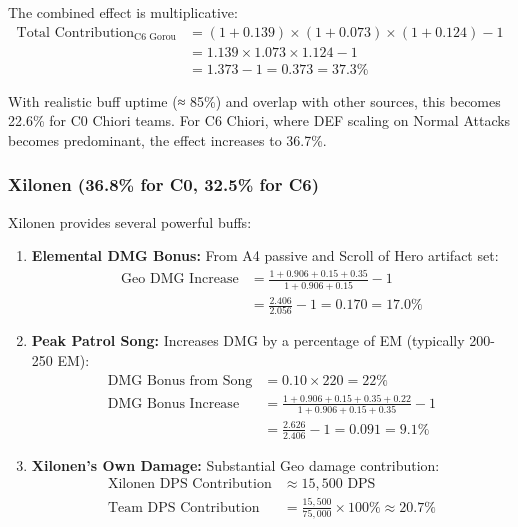 \documentclass[12pt,a4paper]{article}
\begin{document}
The combined effect is multiplicative:
\begin{align}
\text{Total Contribution}_{\text{C6 Gorou}} &= (1 + 0.139) \times (1 + 0.073) \times (1 + 0.124) - 1 \\
&= 1.139 \times 1.073 \times 1.124 - 1 \\
&= 1.373 - 1 = 0.373 = 37.3\%
\end{align}

With realistic buff uptime (≈ 85\%) and overlap with other sources, this becomes 22.6\% for C0 Chiori teams. For C6 Chiori, where DEF scaling on Normal Attacks becomes predominant, the effect increases to 36.7\%.

\subsubsection{Xilonen (36.8\% for C0, 32.5\% for C6)}

Xilonen provides several powerful buffs:

\begin{enumerate}
    \item \textbf{Elemental DMG Bonus:} From A4 passive and Scroll of Hero artifact set:
    \begin{align}
    \text{Geo DMG Increase} &= \frac{1 + 0.906 + 0.15 + 0.35}{1 + 0.906 + 0.15} - 1 \\
    &= \frac{2.406}{2.056} - 1 = 0.170 = 17.0\%
    \end{align}
    
    \item \textbf{Peak Patrol Song:} Increases DMG by a percentage of EM (typically 200-250 EM):
    \begin{align}
    \text{DMG Bonus from Song} &= 0.10 \times 220 = 22\% \\
    \text{DMG Bonus Increase} &= \frac{1 + 0.906 + 0.15 + 0.35 + 0.22}{1 + 0.906 + 0.15 + 0.35} - 1 \\
    &= \frac{2.626}{2.406} - 1 = 0.091 = 9.1\%
    \end{align}
    
    \item \textbf{Xilonen's Own Damage:} Substantial Geo damage contribution:
    \begin{align}
    \text{Xilonen DPS Contribution} &\approx 15,500 \text{ DPS} \\
    \text{Team DPS Contribution} &= \frac{15,500}{75,000} \times 100\% \approx 20.7\%
    \end{align}
\end{enumerate}
\end{document}
